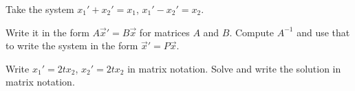 \documentclass{ximera}
\begin{document}
\begin{exercise}
    Take the system $x_1' + x_2' = x_1$, $x_1' - x_2' = x_2$.
    \begin{tasks}
        \task Write it in the form $A {\vec{x}}' = B \vec{x}$ for matrices $A$ and $B$.
        \task Compute $A^{-1}$ and use that to write the system in the form ${\vec{x}}' = P \vec{x}$.
    \end{tasks}
\end{exercise}

\begin{exercise}%
    \begin{tasks}
        \task Write $x_1'=2tx_2$, $x_2'=2tx_2$ in matrix notation.
        \task Solve and write the solution in matrix notation.
    \end{tasks}
\end{exercise}
\end{document}
